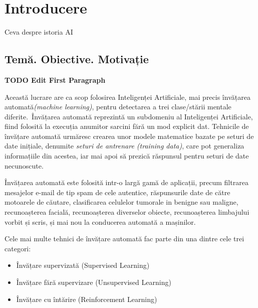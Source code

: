 \chapter{Introducere}\label{ch:1intro}
Ceva despre istoria AI
\section{Temă. Obiective. Motivație}
\textbf{TODO Edit First Paragraph}

Această lucrare are ca scop folosirea Inteligenței Artificiale, mai precis învățarea automată\textit{(machine learning)}, pentru detectarea a trei clase/stării mentale diferite.\ Învățarea automată reprezintă un subdomeniu al Inteligenței Artificiale, fiind folosită la execuția anumitor sarcini fără un mod explicit dat. Tehnicile de învățare automată urmăresc crearea unor modele matematice bazate pe seturi de date inițiale, denumite \textit{seturi de antrenare (training data)}, care pot generaliza informațiile din acestea, iar mai apoi să prezică răspunsul pentru seturi de date necunoscute.

Învățarea automată este folosită intr-o largă gamă de aplicații, precum filtrarea mesajelor e-mail de tip spam de cele autentice, răspunsurile date de către motoarele de căutare, clasificarea celulelor tumorale in benigne sau maligne, recunoașterea facială, recunoașterea diverselor obiecte, recunoașterea limbajului vorbit și scris, și mai nou la conducerea automată a mașinilor. 

Cele mai multe tehnici de învățare automată fac parte din una dintre cele trei categori:
\begin{itemize}
	\item Învățare supervizată (Supervised Learning)
	\item Învățare fără supervizare (Unsupervised Learning)
	\item Învățare cu întărire (Reinforcement Learning)
\end{itemize}

